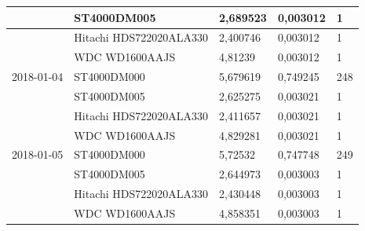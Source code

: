\documentclass{VUMIFPSkursinis}
\begin{document}
\begin{table}[H]
{\begin{tabular}{|l|l|l|l|l|}
\cellcolor[HTML]{C0C0C0}            & ST4000DM005                           & 2,689523                               & 0,003012                             & 1                                    \\ \hline
\cellcolor[HTML]{C0C0C0}            & Hitachi HDS722020ALA330               & 2,400746                               & 0,003012                             & 1                                    \\ \hline
\cellcolor[HTML]{C0C0C0}            & WDC WD1600AAJS                        & 4,81239                                & 0,003012                             & 1                                    \\ \hline
2018-01-04                          & ST4000DM000                           & 5,679619                               & 0,749245                             & 248                                  \\ \hline
\cellcolor[HTML]{C0C0C0}            & ST4000DM005                           & 2,625275                               & 0,003021                             & 1                                    \\ \hline
\cellcolor[HTML]{C0C0C0}            & Hitachi HDS722020ALA330               & 2,411657                               & 0,003021                             & 1                                    \\ \hline
\cellcolor[HTML]{C0C0C0}            & WDC WD1600AAJS                        & 4,829281                               & 0,003021                             & 1                                    \\ \hline
2018-01-05                          & ST4000DM000                           & 5,72532                                & 0,747748                             & 249                                  \\ \hline
\cellcolor[HTML]{C0C0C0}            & ST4000DM005                           & 2,644973                               & 0,003003                             & 1                                    \\ \hline
\cellcolor[HTML]{C0C0C0}            & Hitachi HDS722020ALA330               & 2,430448                               & 0,003003                             & 1                                    \\ \hline
\cellcolor[HTML]{C0C0C0}            & WDC WD1600AAJS                        & 4,858351                               & 0,003003                             & 1                                    \\ \hline

\end{tabular}}
\end{table}
\end{document}
